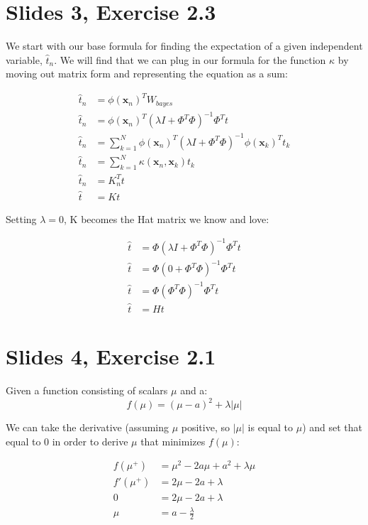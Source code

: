 \documentclass[a4paper,12pt]{article}
\begin{document}
\section{Slides 3, Exercise 2.3}

We start with our base formula for finding the expectation of a given independent variable, $\hat{t}_n$. We will find that we can plug in our formula for the function $\kappa$ by moving out matrix form and representing the equation as a sum:

\begin{align*}
\hat{t}_n &= \phi(\bm{x}_n)^T W_{bayes} \\
\hat{t}_n &= \phi(\bm{x}_n)^T(\lambda I + \Phi^T\Phi)^{-1}\Phi^Tt \\
\hat{t}_n &= \sum_{k=1}^{N}\phi(\bm{x}_n)^T(\lambda I + \Phi^T\Phi)^{-1}\phi(\bm{x}_k)^Tt_k \\
\hat{t}_n &= \sum_{k=1}^{N} \kappa (\bm{x}_n, \bm{x}_k)t_k \\
\hat{t}_n &= K_n^Tt \\
\hat{t} &= Kt
\end{align*}

Setting $\lambda = 0$, K becomes the Hat matrix we know and love:

\begin{align*}
\hat{t} &= \Phi(\lambda I + \Phi^T\Phi)^{-1}\Phi^Tt \\
\hat{t} &= \Phi(0 + \Phi^T\Phi)^{-1}\Phi^Tt \\
\hat{t} &= \Phi(\Phi^T\Phi)^{-1}\Phi^Tt \\
\hat{t} &= Ht
\end{align*}


\section{Slides 4, Exercise 2.1}

Given a function consisting of scalars $\mu$ and a:
$$
f(\mu) = (\mu - a)^2 + \lambda |\mu|
$$

We can take the derivative (assuming $\mu$ positive, so $|\mu|$ is equal to $\mu$) and set that equal to 0 in order to derive $\mu$ that minimizes $f(\mu)$:

\begin{align*}
f(\mu^+) &= \mu^2 - 2a\mu + a^2 + \lambda\mu \\
f'(\mu^+) &= 2\mu - 2a + \lambda \\
0 &= 2\mu - 2a + \lambda \\
\mu &= a - \frac{\lambda}{2}
\end{align*}
\end{document}
